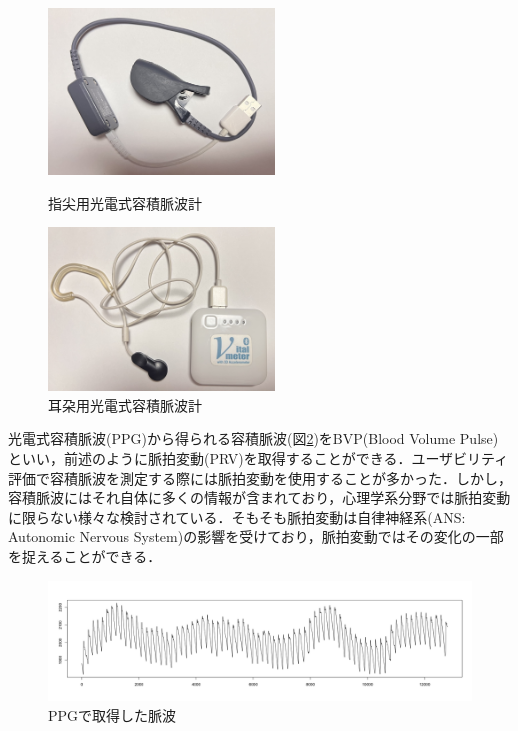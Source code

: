 \begin{figure}[htbp]
\begin{minipage}{0.5\hsize}
    \begin{center}
       \includegraphics[width=60mm]{img/device2.jpg}
    \end{center}
    \caption{指尖用光電式容積脈波計}
    \label{fig:device2}
  \end{minipage}
  \begin{minipage}{0.5\hsize}
    \begin{center}
       \includegraphics[width=60mm]{img/device1.jpg}
    \end{center}
    \caption{耳朶用光電式容積脈波計}
    \label{fig:device1}
  \end{minipage}
\end{figure}

光電式容積脈波(PPG)から得られる容積脈波(図\ref{fig:bvpfukuinone})をBVP(Blood Volume Pulse)といい，前述のように脈拍変動(PRV)を取得することができる．ユーザビリティ評価で容積脈波を測定する際には脈拍変動を使用することが多かった．しかし，容積脈波にはそれ自体に多くの情報が含まれており，心理学系分野では脈拍変動に限らない様々な検討されている．そもそも脈拍変動は自律神経系(ANS: Autonomic Nervous System)の影響を受けており，脈拍変動ではその変化の一部を捉えることができる\cite{peper}．

\begin{figure}[htbp]
    \begin{center}
       \includegraphics[width=\linewidth]{img/bvp_fukui_none.png}
    \end{center}
    \caption{PPGで取得した脈波}
    \label{fig:bvpfukuinone}
\end{figure}

